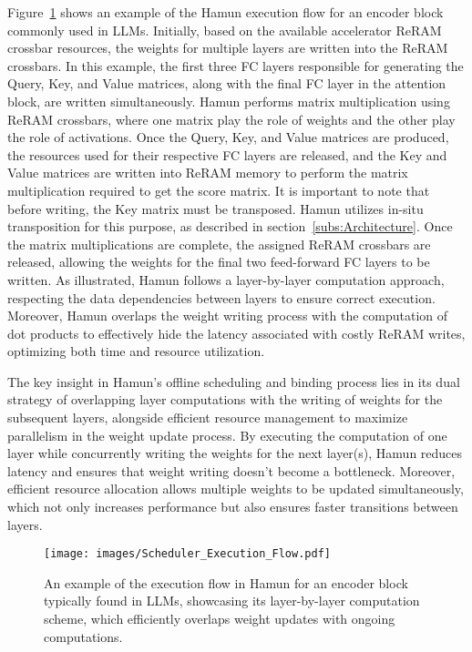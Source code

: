 Figure~\ref{fig:Execution_Flow} shows an example of the Hamun execution flow for an encoder block commonly used in LLMs. Initially, based on the available accelerator ReRAM crossbar resources, the weights for multiple layers are written into the ReRAM crossbars. In this example, the first three FC layers responsible for generating the Query, Key, and Value matrices, along with the final FC layer in the attention block, are written simultaneously. Hamun performs matrix multiplication using ReRAM crossbars, where one matrix play the role of weights and the other play the role of activations. Once the Query, Key, and Value matrices are produced, the resources used for their respective FC layers are released, and the Key and Value matrices are written into ReRAM memory to perform the matrix multiplication required to get the score matrix. It is important to note that before writing, the Key matrix must be transposed. Hamun utilizes in-situ transposition for this purpose, as described in section~\ref{subs:Architecture}. Once the matrix multiplications are complete, the assigned ReRAM crossbars are released, allowing the weights for the final two feed-forward FC layers to be written. As illustrated, Hamun follows a layer-by-layer computation approach, respecting the data dependencies between layers to ensure correct execution. Moreover, Hamun overlaps the weight writing process with the computation of dot products to effectively hide the latency associated with costly ReRAM writes, optimizing both time and resource utilization.

The key insight in Hamun's offline scheduling and binding process lies in its dual strategy of overlapping layer computations with the writing of weights for the subsequent layers, alongside efficient resource management to maximize parallelism in the weight update process. By executing the computation of one layer while concurrently writing the weights for the next layer(s), Hamun reduces latency and ensures that weight writing doesn't become a bottleneck. Moreover, efficient resource allocation allows multiple weights to be updated simultaneously, which not only increases performance but also ensures faster transitions between layers.

\begin{figure}[t!]
    \centering
    \texttt{[image: images/Scheduler\_Execution\_Flow.pdf]}
    \vskip -0.10in
    \caption{An example of the execution flow in Hamun for an encoder block typically found in LLMs, showcasing its layer-by-layer computation scheme, which efficiently overlaps weight updates with ongoing computations.}
    \label{fig:Execution_Flow}
    \vskip -0.25in
\end{figure}

